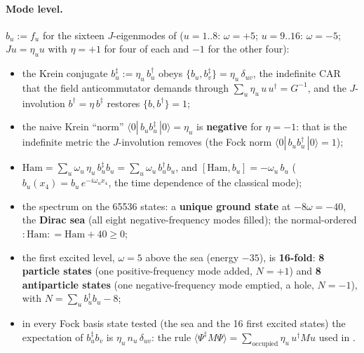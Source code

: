 \paragraph{Mode level.} $b_u:=f_u$ for the sixteen $J$-eigenmodes of  ($u=1..8$:
$\omega=+5$; $u=9..16$: $\omega=-5$; $Ju=\eta_u u$ with $\eta=+1$ for four of each and $-1$ for the
other four):
\begin{itemize}
  \item the Krein conjugate $b_u^{\ddagger}:=\eta_u\,b_u^{\dagger}$ obeys
        $\{b_u,b_v^{\ddagger}\}=\eta_u\,\delta_{uv}$, the indefinite CAR that the field anticommutator
        demands through $\sum_u\eta_u\,u\,u^{\dagger}=G^{-1}$, and the $J$-involution
        $b^{\dagger}=\eta\,b^{\ddagger}$ restores $\{b,b^{\dagger}\}=1$;
  \item the naive Krein ``norm'' $\langle0|\,b_u b_u^{\ddagger}\,|0\rangle=\eta_u$ is
        \textbf{negative} for $\eta=-1$: that is the indefinite metric the $J$-involution removes (the
        Fock norm $\langle0|\,b_u b_u^{\dagger}\,|0\rangle=1$);
  \item $\mathrm{Ham}=\sum_u\omega_u\,\eta_u\,b_u^{\ddagger}b_u=\sum_u\omega_u\,b_u^{\dagger}b_u$, and
        $[\mathrm{Ham},b_u]=-\omega_u\,b_u$ ($b_u(x_4)=b_u\,e^{-i\omega_u x_4}$, the time dependence
        of the classical mode);
  \item the spectrum on the 65536 states: a \textbf{unique ground state} at $-8\omega=-40$, the
        \textbf{Dirac sea} (all eight negative-frequency modes filled); the normal-ordered
        ${:}\mathrm{Ham}{:}=\mathrm{Ham}+40\geq0$;
  \item the first excited level, $\omega=5$ above the sea (energy $-35$), is \textbf{16-fold}:
        \textbf{8 particle states} (one positive-frequency mode added, $N=+1$) and \textbf{8
        antiparticle states} (one negative-frequency mode emptied, a hole, $N=-1$), with
        $N=\sum_u b_u^{\dagger}b_u-8$;
  \item in every Fock basis state tested (the sea and the 16 first excited states) the expectation
        of $b_u^{\ddagger}b_v$ is $\eta_u\,n_u\,\delta_{uv}$: the rule
        $\langle\Psi^{\ddagger}M\Psi\rangle=\sum_{\text{occupied}}\eta_u\,u^{\dagger}Mu$ used in
        .
\end{itemize}
